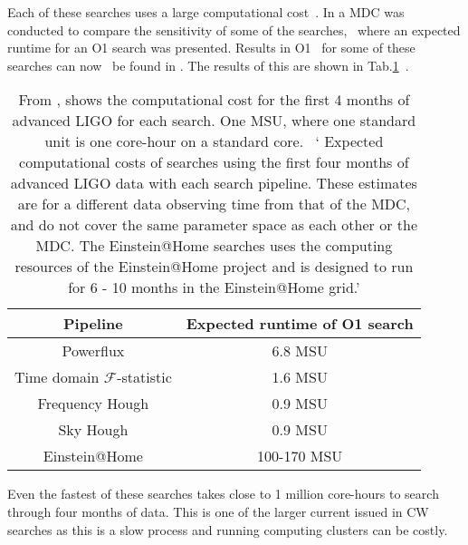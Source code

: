 Each of these searches uses a large computational cost~. In \citep{walsh2016ComparisonMethods} a
\gls{MDC} was conducted to compare the sensitivity of some of the
searches,~ where an expected
runtime for an O1 search was presented. Results in O1~ for some of these searches can now~ be found in
\citep{ligoscientificcollaborationandvirgocollaboration2017AllskySearch}.  The
results of this are shown in Tab.\ref{searchcw:search:semi:cost}~.
%
\begin{table}
	\centering
        \caption[Computational cost of \gls{CW} searches.]{From
\citep{walsh2016ComparisonMethods}, shows the computational cost for the first
4 months of advanced \gls{LIGO} for each search. One \gls{MSU}, where one
standard unit is one core-hour on a standard core.~ ` Expected computational
costs of searches using the first four months of advanced \gls{LIGO} data with
each search pipeline. These estimates are for a different data observing time
from that of the \gls{MDC}, and do not cover the same parameter space as each
other or the \gls{MDC}. The Einstein@Home searches uses the computing resources
of the Einstein@Home project and is designed to run for 6 - 10 months in the
Einstein@Home grid.'  \label{searchcw:search:semi:cost}}
	
        \bgroup {} \centering \begin{tabular}{|c c|} \hline
Pipeline & Expected runtime of O1 search \\ \hline Powerflux & 6.8 MSU \\

		Time domain $\mathcal{F}$-statistic & 1.6 MSU\\

		Frequency Hough & 0.9 MSU \\

		Sky Hough & 0.9 MSU\\
		\hline
		Einstein@Home & 100-170 MSU\\
		\hline

	\end{tabular}
	\egroup
\end{table}
%
Even the fastest of these searches takes close to 1 million core-hours to
search through four months of data.  This is one of the larger current issued
in \gls{CW} searches as this is a slow process and running computing clusters
can be costly.~


